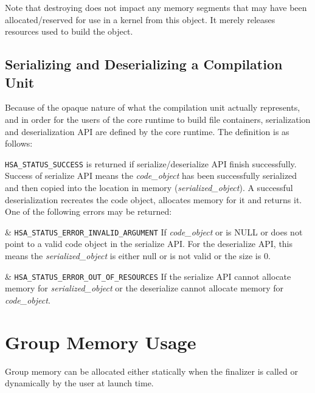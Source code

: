 \documentclass{book}
\begin{document}
\begin{appendices}
\begin{easylist}
\end{easylist}

Note that destroying does not impact any memory segments that may
have been allocated/reserved for use in a kernel from this object.
It merely releases resources used to build the object.

\subsection{Serializing and Deserializing a Compilation Unit}

Because of the opaque nature of what the compilation unit actually
represents, and in order for the users of the core runtime to build
file containers, serialization and deserialization API are defined
by the core runtime. The definition is as follows:



\texttt{HSA\_STATUS\_SUCCESS} is returned if serialize/deserialize
API finish successfully. Success of serialize API means the
{\itshape code\_object} has been successfully serialized and then
copied into the location in memory ({\itshape serialized\_object}).
A successful deserialization recreates the code object, allocates
memory for it and returns it. One of the following errors may be
returned:
\begin{easylist}
& \texttt{HSA\_STATUS\_ERROR\_INVALID\_ARGUMENT} If {\itshape
code\_object} or is NULL or does not point to a valid code object in
the serialize API. For the deserialize API, this means the {\itshape
serialized\_object} is either null or is not valid or the size is 0.

& \texttt{HSA\_STATUS\_ERROR\_OUT\_OF\_RESOURCES} If the serialize API
cannot allocate memory for {\itshape serialized\_object} or the
deserialize cannot allocate memory for {\itshape code\_object}.
\end{easylist}


\hypertarget{coreapi_group_mem}{}\section{Group Memory
Usage}\label{coreapi_group_mem}
Group memory can be allocated either statically when the finalizer
is called or dynamically by the user at launch time.


\end{appendices}
\end{document}
